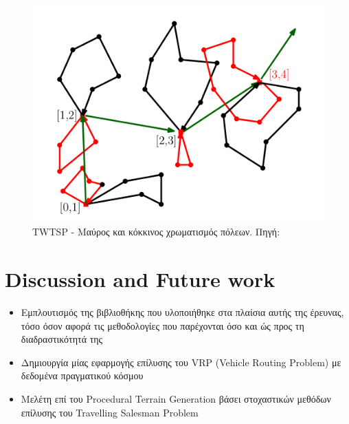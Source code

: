 \documentclass[oneside,12pt]{book}
\newenvironment{matlab}
	{\begin{figure}[hp]\centering\captionsetup{justification=centering}}
	{\end{figure}}
\theoremstyle{definition}
\begin{document}
\begin{matlab}
	\includegraphics[scale=0.8]{images/twtspd.png}
	\caption{TWTSP - Μαύρος και κόκκινος χρωματισμός πόλεων. Πηγή: \cite{12}}
\end{matlab}

\chapter{Discussion and Future work}

\begin{itemize}
    \item Εμπλουτισμός της βιβλιοθήκης που υλοποιήθηκε στα πλαίσια αυτής της έρευνας, τόσο όσον αφορά τις μεθοδολογίες που παρέχονται όσο και ώς προς τη διαδραστικότητά της
    \item Δημιουργία μίας εφαρμογής επίλυσης του VRP (Vehicle Routing Problem) με δεδομένα πραγματικού κόσμου
    \item Μελέτη επί του Procedural Terrain Generation βάσει στοχαστικών μεθόδων επίλυσης του Travelling Salesman Problem
\end{itemize}
\end{document}
